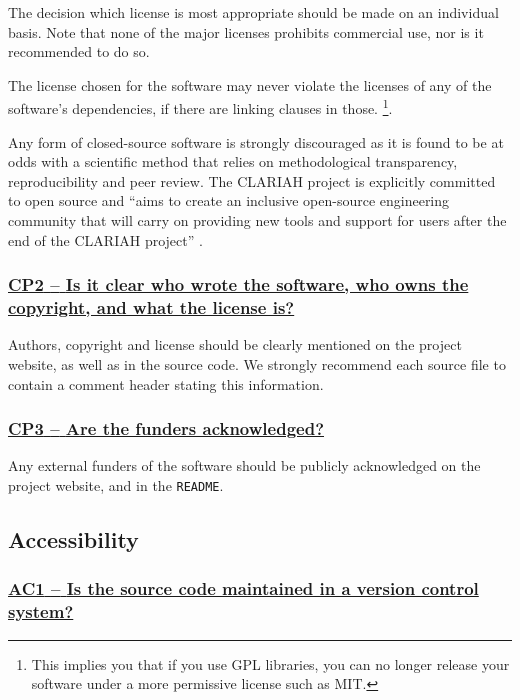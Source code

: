 \documentclass[a4paper,11pt]{article}
\newcommand{\indicator}[1]{\subsubsection*{\underline{#1}}}
\begin{document}
The decision which license is most appropriate should be made on an individual
basis. Note that none of the major licenses prohibits commercial use, nor is it
recommended to do so.

The license chosen for the software may never violate the licenses of any of
the software's dependencies, if there are linking clauses in those. \footnote{This implies you that if you use GPL libraries, you can no longer release your software under a more permissive license such as MIT.}.

Any form of closed-source software is strongly discouraged as it is found to be
at odds with a scientific method that relies on methodological transparency,
reproducibility and peer review. The CLARIAH project is explicitly committed to
open source and ``aims to create an inclusive open-source engineering community
that will carry on providing new tools and support for users after the end of
the CLARIAH project'' \citep{CLARIAHTECHPLAN1}.

\newcommand{\cpTwoName}{CP2}
\newcommand{\cpTwoID}{\cpTwoName}
\newcommand{\cpTwoText}{Is it clear who wrote the software, who owns the copyright, and what the license is?}
\indicator{\cpTwoName{ }--{ }\cpTwoText}\label{id:cp2} 

Authors, copyright and license should be clearly mentioned on the project
website, as well as in the source code.  We strongly recommend each source file to contain a comment header stating this information.

\newcommand{\cpThreeName}{CP3}
\newcommand{\cpThreeID}{\cpThreeName}
\newcommand{\cpThreeText}{Are the funders acknowledged?}
\indicator{\cpThreeName{ }--{ }\cpThreeText}\label{id:cp3} 

Any external funders of the software should be publicly acknowledged on the project
website, and in the \texttt{README}.

\subsection{Accessibility}\label{sec:acc}

\newcommand{\acOneName}{AC1}
\newcommand{\acOneID}{\acOneName}
\newcommand{\acOneText}{Is the source code maintained in a version control system?}
\indicator{\acOneName{ }--{ }\acOneText}\label{id:ac1} 
\end{document}
